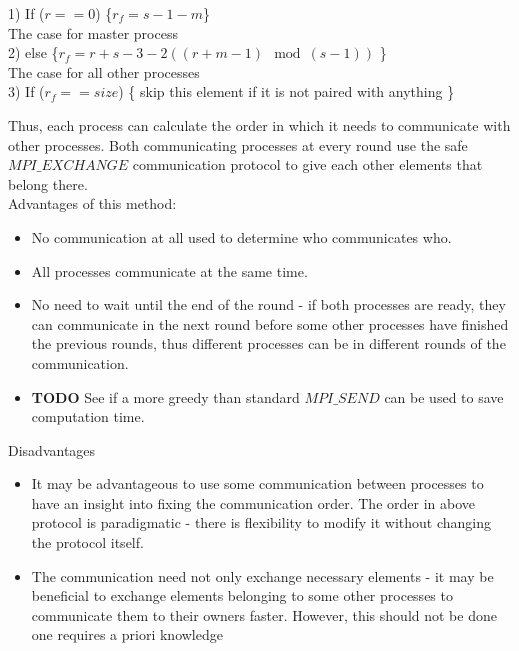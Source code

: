 \documentclass[12pt]{article}
\begin{document}
\begin{mybox}
1) If ($r == 0$) \{$r_f = s - 1 - m$\} \\ \indent  \;\;\;\;\; The case for master process \\
2) else \{$r_f = r + s - 3 - 2((r + m - 1)\mod (s - 1) )$ \} \\  \indent  \;\;\;\;\; The case for all other processes \\
3) If ($r_f == size$) \{ skip this element if it is not paired with anything \}
\end{mybox}

\noindent
Thus, each process can calculate the order in which it needs to communicate with other processes. Both communicating processes at every round use the safe $MPI\_EXCHANGE$ communication protocol to give each other elements that belong there.\\


\noindent
Advantages of this method:
\begin{itemize}
	\item No communication at all used to determine who communicates who.
	\item All processes communicate at the same time.
	\item No need to wait until the end of the round - if both processes are ready, they can communicate in the next round before some other processes have finished the previous rounds, thus different processes can be in different rounds of the communication.
	\item \textbf{TODO\:} See if a more greedy than standard $MPI\_SEND$ can be used to save computation time.
\end{itemize}

\noindent
Disadvantages
\begin{itemize}
	\item It may be advantageous to use some communication between processes to have an insight into fixing the communication order. The order in above protocol is paradigmatic - there is flexibility to modify it without changing the protocol itself.
	\item The communication need not only exchange necessary elements - it may be beneficial to exchange elements belonging to some other processes to communicate them to their owners faster. However, this should not be done one requires a priori knowledge 
\end{itemize}
\end{document}
